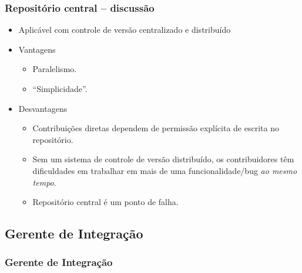 \documentclass{beamer}
\begin{document}
\begin{frame}
  \frametitle{Repositório central -- discussão}
  \begin{itemize}
    \item Aplicável com controle de versão centralizado e distribuído
    \item Vantagens
      \begin{itemize}
        \item<2-> Paralelismo.
        \item<3-> ``Simplicidade''.
      \end{itemize}
    \item Desvantagens
      \begin{itemize}
        \item<4-> Contribuições diretas dependem de permissão explícita de
          escrita no repositório.
        \item<5-> Sem um sistema de controle de versão distribuído, os
          contribuidores têm dificuldades em trabalhar em mais de uma
          funcionalidade/bug \emph{ao mesmo tempo}.
        \item <6->Repositório central é um ponto de falha.
      \end{itemize}
  \end{itemize}
\end{frame}

\subsection{Gerente de Integração}

\begin{frame}
  \frametitle{Gerente de Integração}
  \begin{figure}[h]
    \begin{center}
    \end{center}
    \label{fig:integration-manager}
  \end{figure}
\end{frame}
\end{document}
